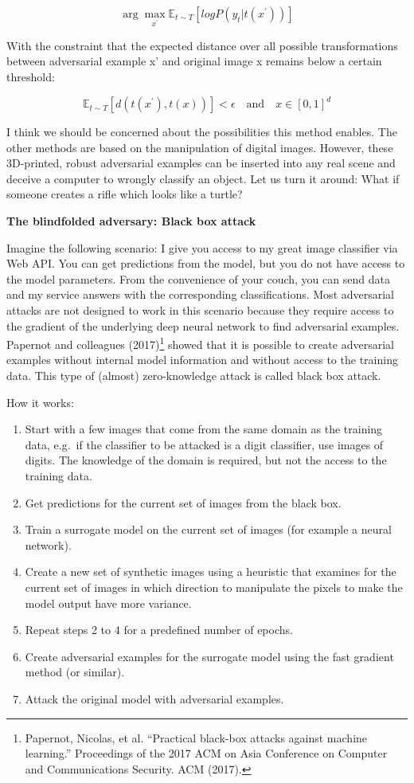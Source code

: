 \documentclass[12pt,]{krantz}
\providecommand{\tightlist}{%
  \setlength{\itemsep}{0pt}\setlength{\parskip}{0pt}}
\begin{document}
\[\arg\max_{x^\prime}\mathbb{E}_{t\sim{}T}[log{}P(y_t|t(x^\prime))]\]

With the constraint that the expected distance over all possible
transformations between adversarial example x' and original image x
remains below a certain threshold:

\[\mathbb{E}_{t\sim{}T}[d(t(x^\prime),t(x))]<\epsilon\quad\text{and}\quad{}x\in[0,1]^d\]

I think we should be concerned about the possibilities this method
enables. The other methods are based on the manipulation of digital
images. However, these 3D-printed, robust adversarial examples can be
inserted into any real scene and deceive a computer to wrongly classify
an object. Let us turn it around: What if someone creates a rifle which
looks like a turtle?

\textbf{The blindfolded adversary: Black box attack}

Imagine the following scenario: I give you access to my great image
classifier via Web API. You can get predictions from the model, but you
do not have access to the model parameters. From the convenience of your
couch, you can send data and my service answers with the corresponding
classifications. Most adversarial attacks are not designed to work in
this scenario because they require access to the gradient of the
underlying deep neural network to find adversarial examples. Papernot
and colleagues (2017)\footnote{Papernot, Nicolas, et al. ``Practical
  black-box attacks against machine learning.'' Proceedings of the 2017
  ACM on Asia Conference on Computer and Communications Security. ACM
  (2017).} showed that it is possible to create adversarial examples
without internal model information and without access to the training
data. This type of (almost) zero-knowledge attack is called black box
attack.

How it works:

\begin{enumerate}
\def\labelenumi{\arabic{enumi}.}
\tightlist
\item
  Start with a few images that come from the same domain as the training
  data, e.g.~if the classifier to be attacked is a digit classifier, use
  images of digits. The knowledge of the domain is required, but not the
  access to the training data.
\item
  Get predictions for the current set of images from the black box.
\item
  Train a surrogate model on the current set of images (for example a
  neural network).
\item
  Create a new set of synthetic images using a heuristic that examines
  for the current set of images in which direction to manipulate the
  pixels to make the model output have more variance.
\item
  Repeat steps 2 to 4 for a predefined number of epochs.
\item
  Create adversarial examples for the surrogate model using the fast
  gradient method (or similar).
\item
  Attack the original model with adversarial examples.
\end{enumerate}
\end{document}
